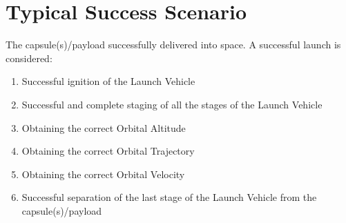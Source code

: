 \documentclass[letterpaper]{article}
\begin{document}
\section{Typical Success Scenario}
The capsule(s)/payload successfully delivered into space.  A
successful launch is considered:
\begin{enumerate}
   \item Successful ignition of the Launch Vehicle
   \item Successful and complete staging of all the stages of the 
      Launch Vehicle
   \item Obtaining the correct Orbital Altitude
   \item Obtaining the correct Orbital Trajectory
   \item Obtaining the correct Orbital Velocity
   \item Successful separation of the last stage of the Launch Vehicle
      from the capsule(s)/payload
\end{enumerate}
\end{document}
